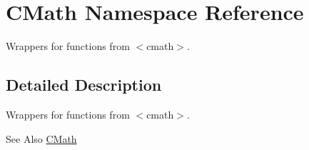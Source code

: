 \hypertarget{namespaceCMath}{\section{C\-Math Namespace Reference}
\label{namespaceCMath}
}


Wrappers for functions from $<$cmath$>$.  




\subsection{Detailed Description}
Wrappers for functions from $<$cmath$>$. \begin{DoxySeeAlso}{See Also}
\hyperlink{group__CMathGroup}{C\-Math} 
\end{DoxySeeAlso}
